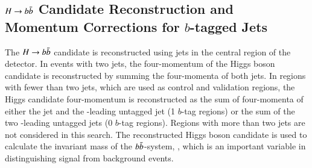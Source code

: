 
\subsection{$H \to b\bar{b}$ Candidate Reconstruction and Momentum Corrections for
  $b$-tagged Jets}%
\label{sec:hbb_reco}%
\label{sec:bjet_momentum_corrections}

The $H \to b\bar{b}$ candidate is reconstructed using jets in the central region
of the detector. In events with two \btagged jets, the four-momentum of the
Higgs boson candidate is reconstructed by summing the four-momenta of both
\btagged jets. In regions with fewer than two \btagged jets, which are used as
control and validation regions, the Higgs candidate four-momentum is
reconstructed as the sum of four-momenta of either the \btagged jet and the
\pT-leading untagged jet (1 $b$-tag regions) or the sum of the two \pT-leading
untagged jets (0 $b$-tag regions). Regions with more than two \btagged jets are
not considered in this search. The reconstructed Higgs boson candidate is used
to calculate the invariant mass of the $b\bar{b}$-system, \mBB, which is an
important variable in distinguishing signal from background events.

